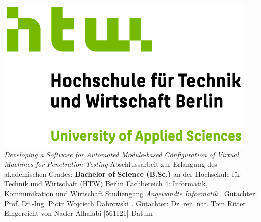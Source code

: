 \begin{titlepage}
\begin{center}
\includegraphics{resources/logo/HTW_Berlin_Logo_farbig.jpg}
\linebreak[4]
\linebreak[4]
\linebreak[4]
\linebreak[4]
\textit{\large Developing a Software for Automated
Module-based Configuration of Virtual Machines
for Penetration Testing}
\linebreak[4]
\linebreak[4]
\linebreak[4]
Abschlussarbeit
\linebreak[4]
\linebreak[4]
zur Erlangung des akademischen Grades:
\linebreak[4]
\linebreak[4]
\textbf{Bachelor of Science (B.Sc.)}
\linebreak[4]
\linebreak[4]
an der
\linebreak[4]
\linebreak[4]
Hochschule f\"ur Technik und Wirtschaft (HTW) Berlin
\linebreak[4]
Fachbereich 4: Informatik, Kommunikation und Wirtschaft
\linebreak[4]
Studiengang \textit{Angewandte Informatik}
\linebreak[4]
\linebreak[4]
. Gutachter: Prof. Dr.-Ing. Piotr Wojciech Dabrowski
. Gutachter: Dr. rer. nat. Tom Ritter
\linebreak[4]
\linebreak[4]
\linebreak[4]
\linebreak[4]
\linebreak[4]
Eingereicht von Nader Alhalabi [561121]
\linebreak[4]
\linebreak[4]
\linebreak[4]
\linebreak[4]
Datum

\end{center}
\end{titlepage}
\newpage
